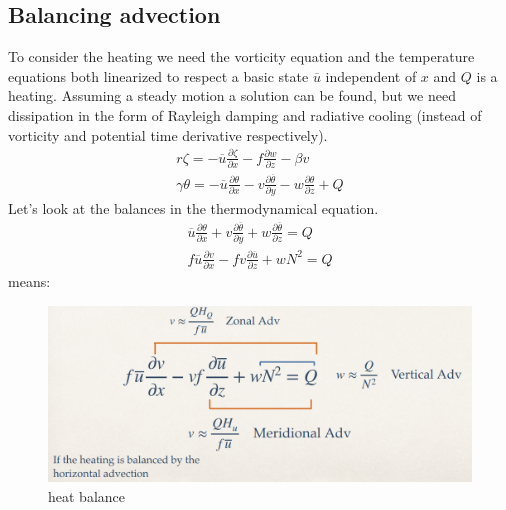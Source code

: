 \subsection{Balancing advection}
To consider the heating we need the vorticity equation and the temperature equations both linearized to respect a basic state $\overline{u}$ independent of $x$ and $Q$ is a heating. Assuming a steady motion a solution can be found, but we need dissipation in the form of Rayleigh damping and radiative cooling (instead of vorticity and potential time derivative respectively).
\begin{align}
    r\zeta=-\overline{u}\frac{\partial\zeta}{\partial x}-f\frac{\partial w}{\partial z}-\beta v\\
    \gamma\theta=-\overline{u}\frac{\partial\theta}{\partial x}-v\frac{\partial\overline{\theta}}{\partial y}-w\frac{\partial\theta}{\partial z}+Q
\end{align}
Let's look at the balances in the thermodynamical equation. 
\begin{align}
    \overline{u}\frac{\partial\theta}{\partial x}+{v}\frac{\partial\overline{\theta}}{\partial y}+w\frac{\partial\overline{\theta}}{\partial z}=Q\\
    f\overline{u}\frac{\partial v}{\partial x}-f{v}\frac{\partial\overline{u}}{\partial z}+wN^2=Q
\end{align}
means: 
\begin{figure}[htp!]
    \centering
    \includegraphics[width=0.5\linewidth]{uploads/Screenshot 2024-11-26 104817.png}
    \caption{heat balance}
\end{figure}

